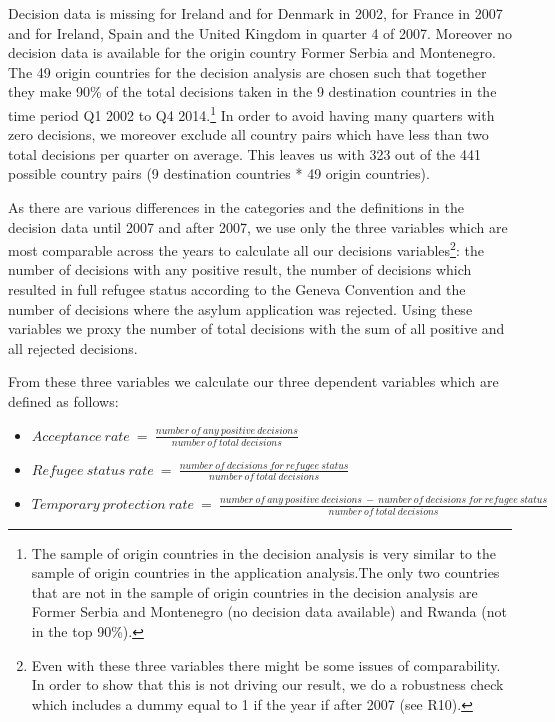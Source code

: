 \documentclass[11pt,a4paper]{scrartcl}
\begin{document}
Decision data is missing for Ireland and for Denmark in 2002, for France in 2007 and for Ireland, Spain and the United Kingdom in quarter 4 of 2007. Moreover no decision data is available for the origin country Former Serbia and Montenegro. The 49 origin countries for the decision analysis are chosen such that together they make 90\% of the total decisions taken in the 9 destination countries in the time period Q1 2002 to Q4 2014.\footnote{The sample of origin countries in the decision analysis is very similar to the sample of origin countries in the application analysis.The only two countries that are not in the sample of origin countries in the decision analysis are Former Serbia and Montenegro (no decision data available) and Rwanda (not in the top 90\%).} In order to avoid having many quarters with zero decisions, we moreover exclude all country pairs which have less than two total decisions per quarter on average. This leaves us with 323 out of the 441 possible country pairs (9 destination countries * 49 origin countries).

As there are various differences in the categories and the definitions in the decision data until 2007 and after 2007, we use only the three variables which are most comparable across the years to calculate all our decisions variables\footnote{Even with these three variables there might be some issues of comparability. In order to show that this is not driving our result, we do a robustness check which includes a dummy equal to 1 if the year if after 2007 (see R10).}: the number of decisions with any positive result, the number of decisions which resulted in full refugee status according to the Geneva Convention and the number of decisions where the asylum application was rejected. Using these variables we proxy the number of total decisions with the sum of all positive and all rejected decisions.     

From these three variables we calculate our three dependent variables which are defined as follows:
\begin{itemize}
	\item $Acceptance~rate~=~\frac{number~of~any~positive~decisions}{number~of~total~decisions}$ 
	\item  $Refugee~status~rate~=~\frac{number~of~decisions~for~refugee~status} {number~of~total~decisions}$ 
	\item $Temporary~protection~rate~=~ \frac{number~of~any~positive~decisions~ - ~number~of~decisions~for~refugee~status} {number~of~total~decisions}$ 
\end{itemize}
\end{document}
